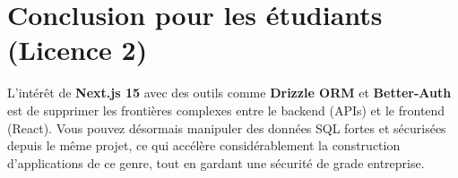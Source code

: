 \documentclass[12pt,a4paper]{article}
\begin{document}
\section{Conclusion pour les étudiants (Licence 2)}
L'intérêt de \textbf{Next.js 15} avec des outils comme \textbf{Drizzle ORM} et \textbf{Better-Auth} est de supprimer les frontières complexes entre le backend (APIs) et le frontend (React). Vous pouvez désormais manipuler des données SQL fortes et sécurisées depuis le même projet, ce qui accélère considérablement la construction d'applications de ce genre, tout en gardant une sécurité de grade entreprise.
\end{document}
